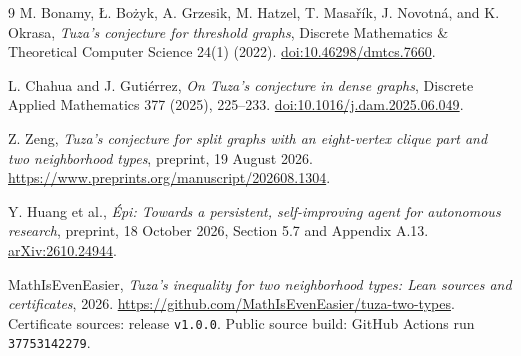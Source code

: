 \documentclass[11pt]{article}
\begin{document}
\begin{thebibliography}{9}
M. Bonamy, \L. Bo\.{z}yk, A. Grzesik, M. Hatzel, T. Masa\v{r}\'{i}k,
J. Novotn\'{a}, and K. Okrasa,
\emph{Tuza's conjecture for threshold graphs},
Discrete Mathematics \& Theoretical Computer Science 24(1) (2022).
\href{https://doi.org/10.46298/dmtcs.7660}{doi:10.46298/dmtcs.7660}.

L. Chahua and J. Guti\'errez,
\emph{On Tuza's conjecture in dense graphs},
Discrete Applied Mathematics 377 (2025), 225--233.
\href{https://doi.org/10.1016/j.dam.2025.06.049}{doi:10.1016/j.dam.2025.06.049}.

Z. Zeng, \emph{Tuza's conjecture for split graphs with an eight-vertex
clique part and two neighborhood types}, preprint, 19 August 2026.
\url{https://www.preprints.org/manuscript/202608.1304}.

Y. Huang et al., \emph{\'{E}pi: Towards a persistent, self-improving agent
for autonomous research}, preprint, 18 October 2026, Section 5.7 and
Appendix A.13.
\href{https://arxiv.org/abs/2610.24944}{arXiv:2610.24944}.

MathIsEvenEasier, \emph{Tuza's inequality for two neighborhood types:
Lean sources and certificates}, 2026.
\url{https://github.com/MathIsEvenEasier/tuza-two-types}.
Certificate sources: release \texttt{v1.0.0}.
Public source build: GitHub Actions run \texttt{37753142279}.
\end{thebibliography}
\end{document}
